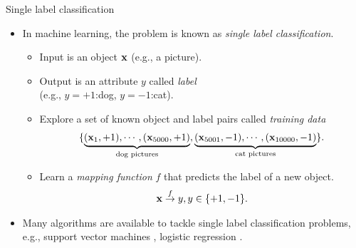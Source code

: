 \documentclass[first=purple,second=dgreen,logo=redexc]{aaltoslides}
\begin{document}
{\begin{frame}{Single label classification}
	\begin{itemize}
		\item In machine learning, the problem is known as \textit{single label classification}.
		\begin{itemize}
			\footnotesize
			\item Input is an object $\mathbf {x}$ (e.g., a picture).
			\item Output is an attribute $y$ called \textit{label}\\ (e.g., $y=+1$:dog, $y=-1$:cat).
			\item Explore a set of known object and label pairs called \textit{training data}
			\begin{align*}
				\{\underbrace{(\mathbf {x}_1,+1),\cdots,(\mathbf {x}_{5000},+1)}_{\text{dog pictures}},\underbrace{(\mathbf {x}_{5001},-1),\cdots, (\mathbf {x}_{10000},-1)}_{\text{cat pictures}}\}.
			\end{align*}
			\item Learn a \textit{mapping function} $f$ that predicts the label of a new object.
			\begin{align*}
				\mathbf {x}\overset{f}{\rightarrow}y,y\in\{+1,-1\}.
			\end{align*}
		\end{itemize}
		\item Many algorithms are available to tackle single label classification problems, e.g., support vector machines \citep{Cortes95support}, logistic regression \citep{Chen99}.
	\end{itemize}
\end{frame}

}
\end{document}
